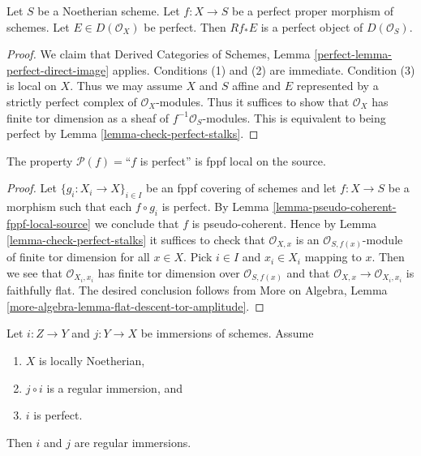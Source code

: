 \begin{lemma}
\label{lemma-perfect-proper-perfect-direct-image}
Let $S$ be a Noetherian scheme. Let $f : X \to S$ be a perfect proper
morphism of schemes. Let $E \in D(\mathcal{O}_X)$ be perfect. Then
$Rf_*E$ is a perfect object of $D(\mathcal{O}_S)$.
\end{lemma}

\begin{proof}
We claim that Derived Categories of Schemes, Lemma
\ref{perfect-lemma-perfect-direct-image} applies.
Conditions (1) and (2) are immediate. Condition (3) is local
on $X$. Thus we may assume $X$ and $S$ affine and $E$
represented by a strictly perfect complex of $\mathcal{O}_X$-modules.
Thus it suffices to show that $\mathcal{O}_X$ has finite
tor dimension as a sheaf of $f^{-1}\mathcal{O}_S$-modules.
This is equivalent to being perfect by
Lemma \ref{lemma-check-perfect-stalks}.
\end{proof}

\begin{lemma}
\label{lemma-perfect-fppf-local-source}
The property $\mathcal{P}(f) =$``$f$ is perfect''
is fppf local on the source.
\end{lemma}

\begin{proof}
Let $\{g_i : X_i \to X\}_{i \in I}$ be an fppf covering of schemes and let
$f : X \to S$ be a morphism such that each $f \circ g_i$ is
perfect. By
Lemma \ref{lemma-pseudo-coherent-fppf-local-source}
we conclude that $f$ is pseudo-coherent.
Hence by
Lemma \ref{lemma-check-perfect-stalks}
it suffices to check that $\mathcal{O}_{X, x}$ is an
$\mathcal{O}_{S, f(x)}$-module of finite tor dimension for all $x \in X$.
Pick $i \in I$ and $x_i \in X_i$ mapping to $x$. Then we see that
$\mathcal{O}_{X_i, x_i}$ has finite tor dimension over
$\mathcal{O}_{S, f(x)}$ and that
$\mathcal{O}_{X, x} \to \mathcal{O}_{X_i, x_i}$ is faithfully flat.
The desired conclusion follows from
More on Algebra, Lemma \ref{more-algebra-lemma-flat-descent-tor-amplitude}.
\end{proof}

\begin{lemma}
\label{lemma-factor-regular-immersion}
Let $i : Z \to Y$ and $j : Y \to X$ be immersions of schemes.
Assume
\begin{enumerate}
\item $X$ is locally Noetherian,
\item $j \circ i$ is a regular immersion, and
\item $i$ is perfect.
\end{enumerate}
Then $i$ and $j$ are regular immersions.
\end{lemma}

